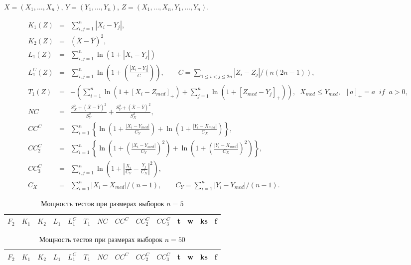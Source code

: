 \documentclass{article}
\begin{document}
$X=(X_1,\ldots,X_n)$, $Y=(Y_1,\ldots,Y_n)$, $Z=(X_1,\ldots,X_n,Y_1,\ldots,Y_n)$.

\begin{eqnarray}
  K_1(Z)&=&\sum_{i,j=1}^{n}{|X_{i}-Y_{j}|},\\
  \label{K6}
  K_2(Z)&=&(\overline{X} - \overline{Y})^2,\\
  \label{L1}
  L_1(Z)&=&\sum_{i,j=1}^{n}{\ln(1+|X_{i}-Y_{j}|)}\\
  \label{L1C}
  L_1^C(Z)&=&\sum_{i,j=1}^{n}{\ln\left(1+\left(\frac{|X_{i}-Y_{j}|}{C}\right)\right)},\qquad C=\sum_{1\le i<j\le 2n}{|Z_{i}-Z_{j}|}/(n(2n-1)),\\
  \label{T1}
  T_1(Z) &=& -\left( \sum_{i=1}^{n} \ln(1+[X_{i}-Z_{med}]_{+}) + \sum_{j=1}^{n} \ln(1+[Z_{med}-Y_{j}]_{+}) \right), \;\; X_{med}\le Y_{med}, \;\; [a]_{+} = a \;\; if \;\; a>0,\\
  \label{NC}
  NC &=& \frac{S_X^2+(\bar X-\bar Y)^2}{S_Y^2} + \frac{S_Y^2+(\bar X-\bar Y)^2}{S_X^2},\\
  \label{CC}
  CC^C &=& \sum_{i=1}^n\left\{\ln\left(1+\frac{|X_i-Y_{med}|}{C_Y}\right) + \ln\left(1+\frac{|Y_i-X_{med}|}{C_X}\right)\right\},\\
  \label{CC2}
  CC_2^C &=& \sum_{i=1}^n\left\{\ln\left(1+\left(\frac{|X_i-Y_{med}|}{C_Y}\right)^2\right) + \ln\left(1+\left(\frac{|Y_i-X_{med}|}{C_X}\right)^2\right)\right\},\\
  \label{CC3}
  CC_3^C &=& \sum_{i,j=1}^n \ln \left( 1+\left| \frac{X_i}{C_Y} - \frac{Y_j}{C_X} \right|^2 \right),\\
  C_X &=& \sum_{i=1}^n|X_i-X_{med}|/(n-1),\qquad C_Y = \sum_{i=1}^n|Y_i-Y_{med}|/(n-1).
  \label{K1}
\end{eqnarray}

\begin{longtable}{|c|c|c|c|c|c|c|c|c|c|c|c|c|c|}
  \caption{Мощность тестов при размерах выборок $n=5$}
  \label{table:n5} \\
  \hline
  $F_2$ & $K_{1}$ & $K_{2}$ & $L_{1}$ & $L_{1}^C$ & $T_1$ & $NC$ & $CC^C$ & $CC_2^C$ & $CC_3^C$ & t & w & ks & f \\ \hline
  
  
  
  
\end{longtable}

\begin{longtable}{|c|c|c|c|c|c|c|c|c|c|c|c|c|c|}
  \caption{Мощность тестов при размерах выборок $n=50$}
  \label{table:n50} \\
  \hline
  $F_2$ & $K_{1}$ & $K_{2}$ & $L_{1}$ & $L_{1}^C$ & $T_1$ & $NC$ & $CC^C$ & $CC_2^C$ & $CC_3^C$ & t & w & ks & f \\ \hline
  
  
  
  
\end{longtable}
\end{document}
